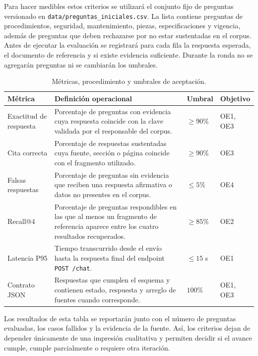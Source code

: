 Para hacer medibles estos criterios se utilizará el conjunto fijo de preguntas versionado en \texttt{data/preguntas\_iniciales.csv}. La lista contiene preguntas de procedimientos, seguridad, mantenimiento, piezas, especificaciones y vigencia, además de preguntas que deben rechazarse por no estar sustentadas en el corpus. Antes de ejecutar la evaluación se registrará para cada fila la respuesta esperada, el documento de referencia y si existe evidencia suficiente. Durante la ronda no se agregarán preguntas ni se cambiarán los umbrales.

\begin{table}[htbp]
\centering
\caption{Métricas, procedimiento y umbrales de aceptación.}
\label{tab:metricas_aceptacion}
\begin{tabular}{p{}p{}p{}p{}}
\toprule
\textbf{Métrica} & \textbf{Definición operacional} & \textbf{Umbral} & \textbf{Objetivo}\\
\midrule
Exactitud de respuesta & Porcentaje de preguntas con evidencia cuya respuesta coincide con la clave validada por el responsable del corpus. & $\geq 90\%$ & OE1, OE3\\
Cita correcta & Porcentaje de respuestas sustentadas cuya fuente, sección o página coincide con el fragmento utilizado. & $\geq 90\%$ & OE3\\
Falsas respuestas & Porcentaje de preguntas sin evidencia que reciben una respuesta afirmativa o datos no presentes en el corpus. & $\leq 5\%$ & OE4\\
Recall@4 & Porcentaje de preguntas respondibles en las que al menos un fragmento de referencia aparece entre los cuatro resultados recuperados. & $\geq 85\%$ & OE2\\
Latencia P95 & Tiempo transcurrido desde el envío hasta la respuesta final del endpoint \texttt{POST /chat}. & $\leq 15$ s & OE1\\
Contrato JSON & Respuestas que cumplen el esquema y contienen estado, respuesta y arreglo de fuentes cuando corresponde. & $100\%$ & OE1, OE3\\
\bottomrule
\end{tabular}
\end{table}

Los resultados de esta tabla se reportarán junto con el número de preguntas evaluadas, los casos fallidos y la evidencia de la fuente. Así, los criterios dejan de depender únicamente de una impresión cualitativa y permiten decidir si el avance cumple, cumple parcialmente o requiere otra iteración.
